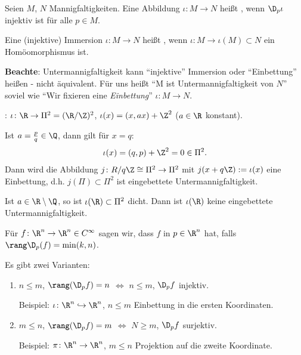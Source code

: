 \begin{definition}
	Seien $M$, $N$ Mannigfaltigkeiten. Eine Abbildung $\iota: M\to N$ heißt , wenn $\D_p \iota$ injektiv ist für alle $p\in M$.
\end{definition}

\begin{definition}
	Eine (injektive) Immersion $\iota\colon M\to N$ heißt , wenn $\iota\colon M\to \iota(M)\subset N$ ein Homöomorphismus ist.
\end{definition}

\textbf{Beachte}: Untermannigfaltigkeit kann "`injektive"' Immersion oder "`Einbettung"' heißen - nicht äquivalent. Für uns heißt "`M ist Untermannigfaltigkeit von $N$"' soviel wie "`Wir fixieren eine \emph{Einbettung}"' $\iota\colon M\to N$.

\begin{example}
	: $\iota\colon\R\to\Pi^2 = (\R\slash\Z)^2$, $\iota(x) = (x,ax) + \Z^2$ ($a\in \R$ konstant).
	
	Ist $a=\frac pq\in \Q$, dann gilt für $x=q$: \begin{align*}
		\iota(x) = (q,p) + \Z^2 = 0\in\Pi^2.
	\end{align*}
	Dann wird die Abbildung $j\colon R\slash q\Z\cong \Pi^2\to \Pi^2$ mit $j(x+q\Z) := \iota(x)$ eine Einbettung, d.h. $j(\Pi)\subset\Pi^2$ ist eingebettete Untermannigfaltigkeit.
	
	Ist $a\in\R\setminus\Q$, so ist $\iota(\R)\subset\Pi^2$ dicht. Dann ist $\iota(\R)$ keine eingebettete Untermannigfaltigkeit.
\end{example}

\begin{definition}
	Für $f\colon\R^n\to\R^n\in C^\infty$ sagen wir, dass $f$  in $p\in\R^n$ hat, falls $\rang \D_p(f) = \min(k,n)$.
	
	Es gibt zwei Varianten: \begin{enumerate}[label={\arabic*)}]
		\item $n\le m$, $\rang (\D_p f) = n$ $\Leftrightarrow$ $n\le m$, $\D_p f$ injektiv.
		
		Beispiel: $\iota\colon\R^n\hookrightarrow \R^n$, $n\le m$ Einbettung in die ersten Koordinaten.
		\item $m\le n$, $\rang(\D_p f) = m$ $\Leftrightarrow$ $N\ge m$, $\D_p f$ surjektiv.
		
		Beispiel: $\pi\colon\R^n\to\R^n$, $m\le n$ Projektion auf die zweite Koordinate.
	\end{enumerate}
\end{definition}

